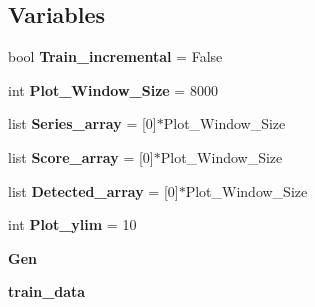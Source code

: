 \subsection*{Variables}
\begin{DoxyCompactItemize}
\item 
bool {\bfseries Train\+\_\+incremental} = False\hypertarget{namespaceSAD_1_1Main__Timestamp_a011586e83c3a13cad8dc17bb9d084619}{}\label{namespaceSAD_1_1Main__Timestamp_a011586e83c3a13cad8dc17bb9d084619}

\item 
int {\bfseries Plot\+\_\+\+Window\+\_\+\+Size} = 8000\hypertarget{namespaceSAD_1_1Main__Timestamp_a61708b02a3c167225c59ac0f61724daa}{}\label{namespaceSAD_1_1Main__Timestamp_a61708b02a3c167225c59ac0f61724daa}

\item 
list {\bfseries Series\+\_\+array} = \mbox{[}0\mbox{]}$\ast$Plot\+\_\+\+Window\+\_\+\+Size\hypertarget{namespaceSAD_1_1Main__Timestamp_a618ae9c7f9cff5df67f8072c312b70da}{}\label{namespaceSAD_1_1Main__Timestamp_a618ae9c7f9cff5df67f8072c312b70da}

\item 
list {\bfseries Score\+\_\+array} = \mbox{[}0\mbox{]}$\ast$Plot\+\_\+\+Window\+\_\+\+Size\hypertarget{namespaceSAD_1_1Main__Timestamp_ab8dcf18772ce1ad9aefcbc88900190ef}{}\label{namespaceSAD_1_1Main__Timestamp_ab8dcf18772ce1ad9aefcbc88900190ef}

\item 
list {\bfseries Detected\+\_\+array} = \mbox{[}0\mbox{]}$\ast$Plot\+\_\+\+Window\+\_\+\+Size\hypertarget{namespaceSAD_1_1Main__Timestamp_a26ab78ba983e3b8a9181939d755c8f81}{}\label{namespaceSAD_1_1Main__Timestamp_a26ab78ba983e3b8a9181939d755c8f81}

\item 
int {\bfseries Plot\+\_\+ylim} = 10\hypertarget{namespaceSAD_1_1Main__Timestamp_a8f503ba9b37038ac3115c4c612cf4718}{}\label{namespaceSAD_1_1Main__Timestamp_a8f503ba9b37038ac3115c4c612cf4718}

\item 
{\bfseries Gen}\hypertarget{namespaceSAD_1_1Main__Timestamp_a88eb3a987cf00bd45598ec9c57b2e991}{}\label{namespaceSAD_1_1Main__Timestamp_a88eb3a987cf00bd45598ec9c57b2e991}

\item 
{\bfseries train\+\_\+data}\hypertarget{namespaceSAD_1_1Main__Timestamp_a93b3cae7a7e75c4bc918789525528fa6}{}\label{namespaceSAD_1_1Main__Timestamp_a93b3cae7a7e75c4bc918789525528fa6}


\end{DoxyCompactItemize}
